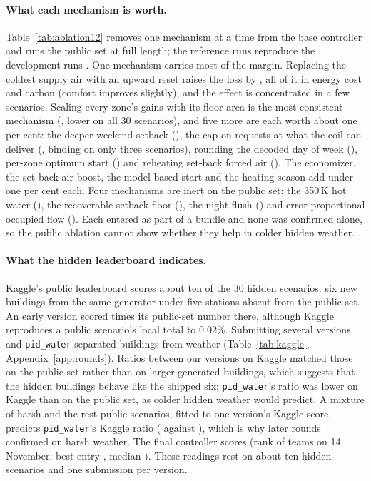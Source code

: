 \documentclass{article}
\begin{document}
\paragraph{What each mechanism is worth.} Table~\ref{tab:ablation12} removes one mechanism at a time from the base controller and runs the public set at full length; the reference runs reproduce the development runs \RElvAbRefMatch. One mechanism carries most of the margin. Replacing the coldest supply air with an upward reset raises the loss by \RElvAbSatRel, all of it in energy cost and carbon (comfort improves slightly), and the effect is concentrated in a few scenarios. Scaling every zone's gains with its floor area is the most consistent mechanism (\RElvAbNoareaRel, lower on all 30 scenarios), and five more are each worth about one per cent: the deeper weekend setback (\RElvAbNoweekendRel), the cap on requests at what the coil can deliver (\RElvAbNowcapRel, binding on only three scenarios), rounding the decoded day of week (\RElvAbNodowRel), per-zone optimum start (\RElvAbNozoneRel) and reheating set-back forced air (\RElvAbNoneutralRel). The economizer, the set-back air boost, the model-based start and the heating season add under one per cent each. Four mechanisms are inert on the public set: the 350\,K hot water (\RElvAbTwRel), the recoverable setback floor (\RElvAbNofloorRel), the night flush (\RElvAbNoflushRel) and error-proportional occupied flow (\RElvAbNooccdynRel). Each entered as part of a bundle and none was confirmed alone, so the public ablation cannot show whether they help in colder hidden weather.



\paragraph{What the hidden leaderboard indicates.} Kaggle's public leaderboard scores about ten of the 30 hidden scenarios: six new buildings from the same generator under five stations absent from the public set. An early version scored \RFiveKagGapPub{} times its public-set number there, although Kaggle reproduces a public scenario's local total to 0.02\%. Submitting several versions and \texttt{pid\_water} separated buildings from weather (Table~\ref{tab:kaggle}, Appendix~\ref{app:rounds}). Ratios between our versions on Kaggle matched those on the public set rather than on larger generated buildings, which suggests that the hidden buildings behave like the shipped six; \texttt{pid\_water}'s ratio was lower on Kaggle than on the public set, as colder hidden weather would predict. A mixture of \RSixMixWPct{} harsh and the rest public scenarios, fitted to one version's Kaggle score, predicts \texttt{pid\_water}'s Kaggle ratio (\RSixMixPid{} against \RSixKagRatioPid), which is why later rounds confirmed on harsh weather. The final controller scores \RFtKagVFourteen{} (rank \FinKagRank{} of \FinKagTeams{} teams on 14 November; best entry \FinKagBest, median \FinKagMedian). These readings rest on about ten hidden scenarios and one submission per version.
\end{document}
